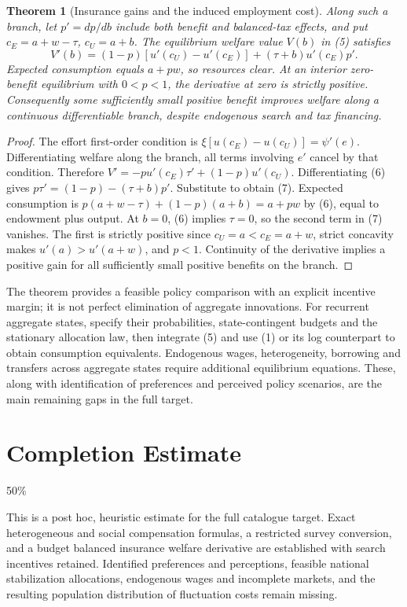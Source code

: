 \documentclass[11pt]{article}
\newtheorem{theorem}{Theorem}
\theoremstyle{remark}
\begin{document}
\begin{theorem}[Insurance gains and the induced employment cost]
Along such a branch, let $p'=dp/db$ include both benefit and balanced-tax
effects, and put $c_E=a+w-\tau$, $c_U=a+b$. The equilibrium welfare
value $V(b)$ in (5) satisfies
\[
 V'(b)=(1-p)[u'(c_U)-u'(c_E)]
       +(\tau+b)u'(c_E)p'.                                      \tag{7}
\]
Expected consumption equals $a+pw$, so resources clear. At an interior
zero-benefit equilibrium with $0<p<1$, the derivative at zero is strictly
positive. Consequently some sufficiently small positive benefit improves
welfare along a continuous differentiable branch, despite endogenous
search and tax financing.
\end{theorem}
\begin{proof}
The effort first-order condition is
$\xi[u(c_E)-u(c_U)]=\psi'(e)$. Differentiating welfare along the
branch, all terms involving $e'$ cancel by that condition. Therefore
$V'=-p u'(c_E)\tau'+(1-p)u'(c_U)$.
Differentiating (6) gives
$p\tau'=(1-p)-(\tau+b)p'$. Substitute to obtain (7).
Expected consumption is
$p(a+w-\tau)+(1-p)(a+b)=a+pw$ by (6), equal to endowment plus output.
At $b=0$, (6) implies $\tau=0$, so the second term in (7) vanishes.
The first is strictly positive since $c_U=a<c_E=a+w$, strict concavity
makes $u'(a)>u'(a+w)$, and $p<1$. Continuity of the derivative implies
a positive gain for all sufficiently small positive benefits on the branch.
\end{proof}
The theorem provides a feasible policy comparison with an explicit
incentive margin; it is not perfect elimination of aggregate innovations.
For recurrent aggregate states, specify their probabilities, state-contingent
budgets and the stationary allocation law, then integrate (5) and use
(1) or its log counterpart to obtain consumption equivalents. Endogenous
wages, heterogeneity, borrowing and transfers across aggregate states
require additional equilibrium equations. These, along with identification
of preferences and perceived policy scenarios, are the main remaining
gaps in the full target.

\section{Completion Estimate}
50\%

This is a post hoc, heuristic estimate for the full catalogue target.
Exact heterogeneous and social compensation formulas, a restricted survey conversion, and a budget balanced insurance welfare derivative are established with search incentives retained. Identified preferences and perceptions, feasible national stabilization allocations, endogenous wages and incomplete markets, and the resulting population distribution of fluctuation costs remain missing.
\end{document}
